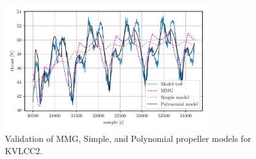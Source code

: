 \hfill
\begin{minipage}[c]{0.49\textwidth}
\label{\detokenize{06.20_results_kvlcc2:kvlcc2-propeller-model}}

\end{minipage}
\begin{figure}[!htb]
\centering
\includegraphics[width=0.78\textwidth]{kappa/images/13.pdf}
\caption{Validation of MMG, Simple, and Polynomial propeller models for KVLCC2.}\label{\detokenize{06.20_results_kvlcc2:fig-propeller-validation}}\end{figure}
\clearpage
